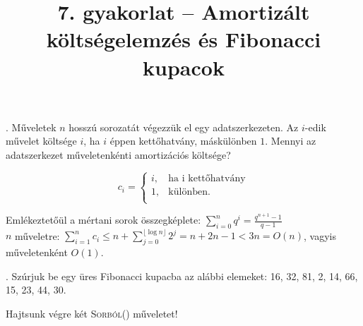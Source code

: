 \documentclass[12pt]{article}
\date{}
\title{7. gyakorlat -- Amortizált költségelemzés és Fibonacci kupacok}
\begin{document}
\maketitle 

. Műveletek $n$ hosszú sorozatát végezzük el egy 
adatszerkezeten. Az $i$-edik művelet költsége $i$, ha $i$ éppen
kettőhatvány, máskülönben $1$. Mennyi az adatszerkezet műveletenkénti 
amortizációs költsége?

$$ c_i=\begin{cases}
i,& \text{ha i kettőhatvány}\\
1,& \text{különben.} \\
\end{cases} $$

Emlékeztetőül a mértani sorok összegképlete: $\sum\limits_{i=0}^n q^i = 
\frac{q^{n+1}-1}{q-1}$\\
$n$ műveletre: $\sum\limits_{i=1}^n c_i \leq n 
+ \sum\limits_{j=0}^{\lfloor \log{n} \rfloor}
2^j = n + 2n - 1 < 3n = O(n)$, vagyis műveletenként $O(1)$.

\vspace{1em}

.
Szúrjuk be egy üres Fibonacci kupacba az alábbi elemeket: 16, 32, 81, 2, 14, 
66, 15, 23, 44, 30.

\begin{figure}[!ht]
	\centering
\end{figure}

Hajtsunk végre két {\scshape Sorból()} műveletet!
\end{document}
